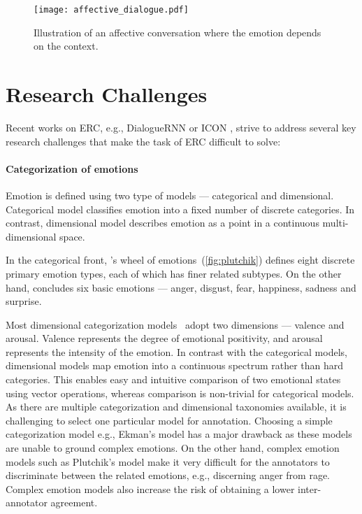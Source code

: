 \documentclass{IEEEtran}\usepackage[pdftex]{graphicx}
\begin{document}
	\begin{figure}
		\centering
		\texttt{[image: affective\_dialogue.pdf]}
		\caption{Illustration of an affective conversation where the emotion depends on the context.}
		\label{fig:affective-dialogue}
	\end{figure}
	
	\section{Research Challenges}
	\label{sec:challenge}


	Recent works on ERC, e.g., DialogueRNN \cite{majumder2019dialoguernn} or ICON \cite{hazarika2018icon}, strive to address several key research challenges that make the
	task of ERC difficult to solve:
	
	\paragraph{Categorization of emotions}


	Emotion is defined using two type of models --- categorical and
	dimensional. Categorical model classifies emotion into a fixed number of
	discrete categories. In contrast, dimensional model describes emotion as a point in
	a continuous multi-dimensional space.
	
	In the categorical front, \citet{plutchik}'s wheel of emotions~(\cref{fig:plutchik}) defines eight
	discrete primary emotion types, each of which has finer related subtypes. 
	On the other hand, \citet{ekman1993facial} concludes six basic emotions ---
	anger, disgust, fear, happiness, sadness and surprise.
	
	Most dimensional categorization models~\citep{jamesrussel,Mehrabian1996} adopt two dimensions
	--- valence and arousal. Valence represents the degree of emotional positivity, and arousal represents the intensity of the emotion. In contrast with
	the categorical models, dimensional
	models map emotion into a continuous spectrum rather than hard categories. This enables easy and intuitive comparison of two emotional states using vector operations, whereas comparison is non-trivial for categorical models. As there are multiple categorization and dimensional taxonomies available, it is challenging to select one particular model for annotation. Choosing a simple categorization model e.g., Ekman's model has a major drawback as these models are unable to ground complex emotions. On the other hand, complex emotion models such as Plutchik's model make it very difficult for the annotators to discriminate between the related emotions, e.g., discerning anger from rage. Complex emotion models also increase the risk of obtaining a lower inter-annotator agreement.
	
\end{document}
